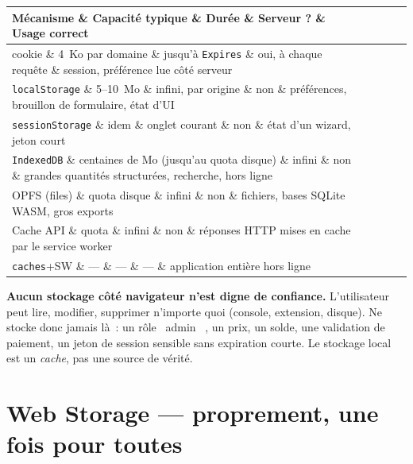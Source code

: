 \documentclass[12pt,a4paper,twoside,openright]{book}
\makeatletter
\newenvironment{tabz}[1]{\rowcolors{2}{white}{tralight}%
  \small\setlength{\tabcolsep}{5pt}\setlength{\LTpre}{3pt}\setlength{\LTpost}{3pt}%
  \begin{longtable}{@{}#1@{}}\toprule}
  {\bottomrule\end{longtable}\normalfont\setlength{\tabcolsep}{6pt}}
\newcommand{\thd}[1]{\textbf{\color{white}#1}}
\newcommand{\headrow}{\rowcolor{theadbg}}
\makeatother
\begin{document}
\begin{tabz}{llllX}
  \headrow \thd{M\'ecanisme} \& \thd{Capacit\'e typique} \& \thd{Dur\'ee} \& \thd{Serveur ?} \& \thd{Usage correct} \\
  \midrule
  cookie \& 4~Ko par domaine \& jusqu'\`a \verb|Expires| \& oui, \`a chaque requ\^ete \& session, pr\'ef\'erence lue c\^ot\'e serveur \\
  \verb|localStorage| \& 5--10~Mo \& infini, par origine \& non \& pr\'ef\'erences, brouillon de formulaire, \'etat d'UI \\
  \verb|sessionStorage| \& idem \& onglet courant \& non \& \'etat d'un wizard, jeton court \\
  \verb|IndexedDB| \& centaines de Mo (jusqu'au quota disque) \& infini \& non \& grandes quantit\'es structur\'ees, recherche, hors ligne \\
  OPFS (files) \& quota disque \& infini \& non \& fichiers, bases SQLite WASM, gros exports \\
  Cache API \& quota \& infini \& non \& r\'eponses HTTP mises en cache par le service worker \\
  \verb|caches|+SW \& --- \& --- \& --- \& application enti\`ere hors ligne \\
\end{tabz}

\begin{piege}
\textbf{Aucun stockage c\^ot\'e navigateur n'est digne de confiance.} L'utilisateur peut lire,
modifier, supprimer n'importe quoi (console, extension, disque). Ne stocke donc jamais l\`a~:
un r\^ole \og ~admin~ \fg{}, un prix, un solde, une validation de paiement, un jeton de session sensible
sans expiration courte. Le stockage local est un \emph{cache}, pas une source de v\'erit\'e.
\end{piege}

\section{Web Storage --- proprement, une fois pour toutes}
\end{document}
